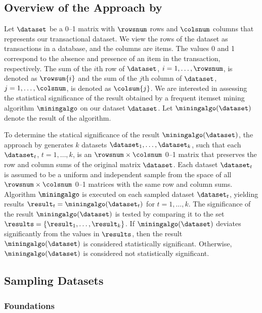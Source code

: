 \subsection{Overview of the Approach by
  \texorpdfstring{\citeauthor{GionisMMT07}}{Gionis et al.}}

Let $\dataset$ be a 0--1 matrix with $\rowsnum$ rows and $\colsnum$ columns that
represents our transactional dataset. We view the rows of the dataset as
transactions in a database, and the columns are items. The values 0 and 1
correspond to the absence and presence of an item in the transaction,
respectively. The sum of the $i$th row of $\dataset$, $i = 1, \dots, \rowsnum$,
is denoted as $\rowsum{i}$ and the sum of the $j$th column of $\dataset$, $j =
1, \dots, \colsnum$, is denoted as $\colsum{j}$. We are interested in assessing
the statistical significance of the result obtained by a frequent itemset
mining algorithm $\miningalgo$ on our dataset $\dataset$. Let $\miningalgo(\dataset)$
denote the result of the algorithm.

To determine the statical significance of the result $\miningalgo(\dataset)$, the
approach by \citet{GionisMMT07} generates $k$ datasets $\dataset_1, \dots,
\dataset_k$, such that each $\dataset_t$, $t = 1, \dots, k$, is an $\rowsnum
\times \colsnum$ 0--1 matrix that preserves the row and column sums of the
original matrix $\dataset$. Each dataset $\dataset_t$ is assumed to be a
uniform and independent sample from the space of all $\rowsnum \times \colsnum$
0--1 matrices with the same row and column sums. Algorithm $\miningalgo$ is executed
on each sampled dataset $\dataset_t$, yielding results $\result_t =
\miningalgo(\dataset_t)$ for $t = 1, \dots, k$. The significance of the result
$\miningalgo(\dataset)$ is tested by comparing it to the set $\results = \{\result_1,
\dots, \result_k\}$.  If $\miningalgo(\dataset)$ deviates significantly from the
values in $\results$, then the result $\miningalgo(\dataset)$ is considered
statistically significant. Otherwise, $\miningalgo(\dataset)$ is considered not
statistically significant.

\subsection{Sampling Datasets}

\subsubsection{Foundations}


